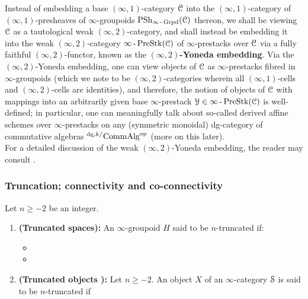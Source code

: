                 \begin{remark} \label{remark: weak_(infinity, 2)_yoneda}
                    Instead of embedding a base $(\infty, 1)$-category $\C$ into the $(\infty, 1)$-category of $(\infty, 1)$-presheaves of $\infty$-groupoids $\Psh_{\infty\-\Grpd}(\C)$ thereon, we shall be viewing $\C$ as a tautological weak $(\infty, 2)$-category, and shall instead be embedding it into the weak $(\infty, 2)$-category $\infty\-\Pre\Stk(\C)$ of $\infty$-prestacks over $\C$ via a fully faithful $(\infty, 2)$-functor, known as the \textbf{$(\infty, 2)$-Yoneda embedding}. Via the $(\infty, 2)$-Yoneda embedding, one can view objects of $\C$ as $\infty$-prestacks fibred in $\infty$-groupoids (which we note to be $(\infty, 2)$-categories wherein all $(\infty, 1)$-cells and $(\infty, 2)$-cells are identities), and therefore, the notion of objects of $\C$ with mappings into an arbitrarily given base $\infty$-prestack $\calY \in \infty\-\Pre\Stk(\C)$ is well-defined; in particular, one can meaningfully talk about so-called derived affine schemes over $\infty$-prestacks on any (symmetric monoidal) dg-category of commutative algebras ${}^{\dg, k/}\Comm\Alg^{\op}$ (more on this later). 
                    \\
                    For a detailed discussion of the weak $(\infty, 2)$-Yoneda embedding, the reader may consult \cite{nlab:yoneda_lemma_for_bicategories}.
                \end{remark}
                
            \subsubsection{Truncation; connectivity and co-connectivity}
                \begin{definition} \label{def: truncated_objects} 
                    Let $n \geq -2$ be an integer.
                    \begin{enumerate}
                        \item \textbf{(Truncated spaces):} An $\infty$-groupoid $H$ said to be $n$-truncated if:
                            \begin{itemize}
                                \item  
                                \item
                            \end{itemize}
                        \item \textbf{(Truncated objects \cite[Definition 5.5.6.1]{HTT}):} Let $n \geq -2$. An object $X$ of an $\infty$-category $\S$ is said to be $n$-truncated if
                    \end{enumerate}
                \end{definition}
    
